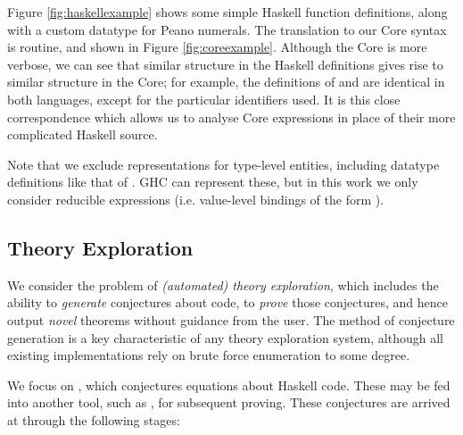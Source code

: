 Figure \ref{fig:haskellexample} shows some simple Haskell function definitions, along with a custom datatype for Peano numerals. The translation to our Core syntax is routine, and shown in Figure \ref{fig:coreexample}. Although the Core is more verbose, we can see that similar structure in the Haskell definitions gives rise to similar structure in the Core; for example, the definitions of  and  are identical in both languages, except for the particular identifiers used. It is this close correspondence which allows us to analyse Core expressions in place of their more complicated Haskell source.

Note that we exclude representations for type-level entities, including datatype definitions like that of . GHC can represent these, but in this work we only consider reducible expressions (i.e. value-level bindings of the form \mbox{}).

\subsection{Theory Exploration}
\label{sec:theoryexploration}

We consider the problem of \emph{(automated) theory exploration}, which includes the ability to \emph{generate} conjectures about code, to \emph{prove} those conjectures, and hence output \emph{novel} theorems without guidance from the user. The method of conjecture generation is a key characteristic of any theory exploration system, although all existing implementations rely on brute force enumeration to some degree.

We focus on \qspec{} \cite{QuickSpec}, which conjectures equations about Haskell code. These may be fed into another tool, such as \hspec{}, for subsequent proving. These conjectures are arrived at through the following stages:

\iffalse TODO: Make this more formal?
 V \in Var
 F \in Fun
 T \in Term
 T ::= V | F | T1 T2

 Term ::= VAR | Const | Fun (Term)
or
 Term t ::= x | f | t t'
\fi

